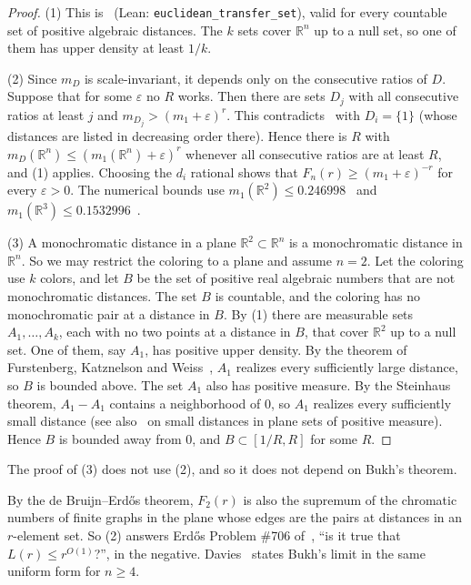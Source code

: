 \documentclass[11pt]{amsart}
\theoremstyle{definition}
\newcommand{\R}{\mathbb{R}}
\begin{document}
\begin{proof}
(1) This is~\cite[transfer for sets of algebraic distances]{BassR3} (Lean: \texttt{euclidean\_transfer\_set}), valid for every countable set of positive algebraic distances. The $k$ sets cover $\R^n$ up to a null set, so one of them has upper density at least $1/k$.

(2) Since $m_D$ is scale-invariant, it depends only on the consecutive ratios of $D$. Suppose that for some $\varepsilon$ no $R$ works. Then there are sets $D_j$ with all consecutive ratios at least $j$ and $m_{D_j}>(m_1+\varepsilon)^r$. This contradicts~\cite[Theorem 1]{Bukh} with $D_i=\{1\}$ (whose distances are listed in decreasing order there). Hence there is $R$ with $m_D(\R^n)\le(m_1(\R^n)+\varepsilon)^r$ whenever all consecutive ratios are at least $R$, and (1) applies. Choosing the $d_i$ rational shows that $F_n(r)\ge(m_1+\varepsilon)^{-r}$ for every $\varepsilon>0$. The numerical bounds use $m_1(\R^2)\le0.246998$~\cite[Section 8]{ACMVZ} and $m_1(\R^3)\le0.1532996$~\cite{DOV}.

(3) A monochromatic distance in a plane $\R^2\subset\R^n$ is a monochromatic distance in $\R^n$. So we may restrict the coloring to a plane and assume $n=2$. Let the coloring use $k$ colors, and let $B$ be the set of positive real algebraic numbers that are not monochromatic distances. The set $B$ is countable, and the coloring has no monochromatic pair at a distance in $B$. By (1) there are measurable sets $A_1,\dots,A_k$, each with no two points at a distance in $B$, that cover $\R^2$ up to a null set. One of them, say $A_1$, has positive upper density. By the theorem of Furstenberg, Katznelson and Weiss~\cite{FKW}, $A_1$ realizes every sufficiently large distance, so $B$ is bounded above. The set $A_1$ also has positive measure. By the Steinhaus theorem, $A_1-A_1$ contains a neighborhood of $0$, so $A_1$ realizes every sufficiently small distance (see also~\cite{Falconer} on small distances in plane sets of positive measure). Hence $B$ is bounded away from $0$, and $B\subset[1/R,R]$ for some $R$.
\end{proof}

The proof of (3) does not use (2), and so it does not depend on Bukh's theorem.

By the de Bruijn--Erd\H{o}s theorem, $F_2(r)$ is also the supremum of the chromatic numbers of finite graphs in the plane whose edges are the pairs at distances in an $r$-element set. So (2) answers Erd\H{o}s Problem \#706 of~\cite{EP}, ``is it true that $L(r)\le r^{O(1)}$?'', in the negative. Davies~\cite[Theorem 1.2]{Davies} states Bukh's limit in the same uniform form for $n\ge4$.
\end{document}
